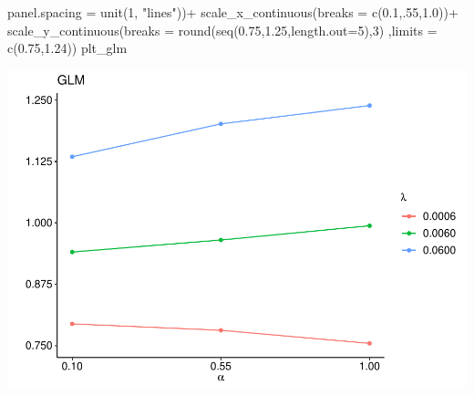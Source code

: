 \documentclass[
]{article}
\newenvironment{Shaded}{\begin{snugshade}}{\end{snugshade}}
\newcommand{\AttributeTok}[1]{\textcolor[rgb]{0.77,0.63,0.00}{#1}}
\newcommand{\DecValTok}[1]{\textcolor[rgb]{0.00,0.00,0.81}{#1}}
\newcommand{\FloatTok}[1]{\textcolor[rgb]{0.00,0.00,0.81}{#1}}
\newcommand{\FunctionTok}[1]{\textcolor[rgb]{0.00,0.00,0.00}{#1}}
\newcommand{\NormalTok}[1]{#1}
\newcommand{\SpecialCharTok}[1]{\textcolor[rgb]{0.00,0.00,0.00}{#1}}
\newcommand{\StringTok}[1]{\textcolor[rgb]{0.31,0.60,0.02}{#1}}
\begin{document}
\begin{Shaded}
\begin{Highlighting}[]
        \AttributeTok{panel.spacing =} \FunctionTok{unit}\NormalTok{(}\DecValTok{1}\NormalTok{, }\StringTok{"lines"}\NormalTok{))}\SpecialCharTok{+}
  \FunctionTok{scale\_x\_continuous}\NormalTok{(}\AttributeTok{breaks =} \FunctionTok{c}\NormalTok{(}\FloatTok{0.1}\NormalTok{,.}\DecValTok{55}\NormalTok{,}\FloatTok{1.0}\NormalTok{))}\SpecialCharTok{+}
  \FunctionTok{scale\_y\_continuous}\NormalTok{(}\AttributeTok{breaks =} \FunctionTok{round}\NormalTok{(}\FunctionTok{seq}\NormalTok{(}\FloatTok{0.75}\NormalTok{,}\FloatTok{1.25}\NormalTok{,}\AttributeTok{length.out=}\DecValTok{5}\NormalTok{),}\DecValTok{3}\NormalTok{)}
\NormalTok{                     ,}\AttributeTok{limits =} \FunctionTok{c}\NormalTok{(}\FloatTok{0.75}\NormalTok{,}\FloatTok{1.24}\NormalTok{))}
\NormalTok{plt\_glm}
\end{Highlighting}
\end{Shaded}

\includegraphics{sl-inf-cairs-2301_files/figure-latex/optResults-2.pdf}
\end{document}
